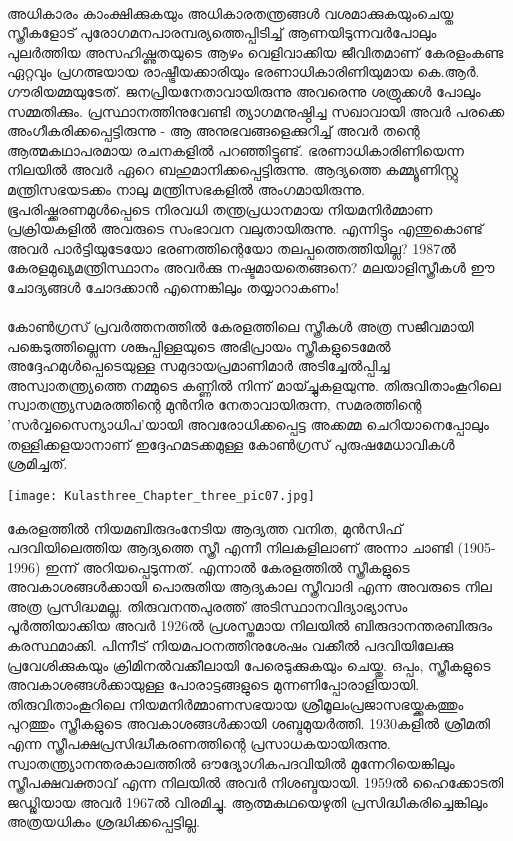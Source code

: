 \paragraph{}

അധികാരം കാംക്ഷിക്കുകയും അധികാരതന്ത്രങ്ങൾ വശമാക്കുകയുംചെയ്ത സ്ത്രീകളോട് പുരോഗമനപാരമ്പര്യത്തെപ്പിടിച്ച് ആണയിടുന്നവർപോലും പുലർത്തിയ അസഹിഷ്ണുതയുടെ ആഴം വെളിവാക്കിയ ജീവിതമാണ് കേരളംകണ്ട ഏറ്റവും പ്രഗത്ഭയായ രാഷ്ട്രീയക്കാരിയും ഭരണാധികാരിണിയുമായ കെ.ആർ. ഗൗരിയമ്മയുടേത്. ജനപ്രിയനേതാവായിരുന്നു അവരെന്നു ശത്രുക്കൾ പോലും സമ്മതിക്കും.
പ്രസ്ഥാനത്തിനുവേണ്ടി ത്യാഗമനുഷ്ഠിച്ച സഖാവായി അവർ പരക്കെ അംഗീകരിക്കപ്പെട്ടിരുന്നു - ആ അനുഭവങ്ങളെക്കുറിച്ച് അവർ തന്റെ ആത്മകഥാപരമായ രചനകളിൽ പറഞ്ഞിട്ടുണ്ട്. ഭരണാധികാരിണിയെന്ന നിലയിൽ അവർ ഏറെ ബഹുമാനിക്കപ്പെട്ടിരുന്നു. ആദ്യത്തെ കമ്മ്യൂണിസ്റ്റു മന്ത്രിസഭയടക്കം നാലു മന്ത്രിസഭകളിൽ അംഗമായിരുന്നു. ഭൂപരിഷ്ക്കരണമുൾപ്പെടെ നിരവധി തന്ത്രപ്രധാനമായ നിയമനിർമ്മാണ പ്രക്രിയകളിൽ അവരുടെ സംഭാവന വലുതായിരുന്നു. എന്നിട്ടും എന്തുകൊണ്ട് അവർ പാർട്ടിയുടേയോ ഭരണത്തിന്റെയോ തലപ്പത്തെത്തിയില്ല? 1987ൽ കേരളമുഖ്യമന്ത്രിസ്ഥാനം അവർക്കു നഷ്ടമായതെങ്ങനെ? മലയാളിസ്ത്രീകൾ ഈ ചോദ്യങ്ങൾ ചോദക്കാൻ എന്നെങ്കിലും തയ്യാറാകണം!
\paragraph{}

കോൺഗ്രസ് പ്രവർത്തനത്തിൽ കേരളത്തിലെ സ്ത്രീകൾ അത്ര സജീവമായി പങ്കെടുത്തില്ലെന്ന ശങ്കുപ്പിള്ളയുടെ അഭിപ്രായം സ്ത്രീകളുടെമേൽ അദ്ദേഹമുൾപ്പെടെയുള്ള സമുദായപ്രമാണിമാർ അടിച്ചേൽപ്പിച്ച അസ്വാതന്ത്ര്യത്തെ നമ്മുടെ കണ്ണിൽ നിന്ന് മായ്ച്ചുകളയുന്നു. തിരുവിതാംകൂറിലെ സ്വാതന്ത്ര്യസമരത്തിന്റെ മുൻനിര നേതാവായിരുന്ന, സമരത്തിന്റെ 'സർവ്വസൈന്യാധിപ'യായി അവരോധിക്കപ്പെട്ട അക്കമ്മ ചെറിയാനെപ്പോലും തള്ളിക്കളയാനാണ് ഇദ്ദേഹമടക്കമുള്ള കോൺഗ്രസ് പുരുഷമേധാവികൾ ശ്രമിച്ചത്.

\label{ch3box3} %
\begin{tcolorbox}[%
 breakable, %
  arc=0mm, 
  left=1pt, right = 1pt, 
  boxrule=0mm,
  colback = {blue!10}, %
] 
\begin{center}
\texttt{[image: Kulasthree\_Chapter\_three\_pic07.jpg]}
\end{center}

കേരളത്തിൽ നിയമബിരുദംനേടിയ ആദ്യത്ത വനിത, മുൻസിഫ് പദവിയിലെത്തിയ ആദ്യത്തെ സ്ത്രീ എന്നീ നിലകളിലാണ് അന്നാ ചാണ്ടി (1905-1996) ഇന്ന് അറിയപ്പെടുന്നത്. എന്നാൽ കേരളത്തിൽ സ്ത്രീകളുടെ അവകാശങ്ങൾക്കായി പൊരുതിയ ആദ്യകാല സ്ത്രീവാദി എന്ന അവരുടെ നില അത്ര പ്രസിദ്ധമല്ല. തിരുവനന്തപുരത്ത് അടിസ്ഥാനവിദ്യാഭ്യാസം പൂർത്തിയാക്കിയ അവർ 1926ൽ പ്രശസ്തമായ നിലയിൽ ബിരുദാനന്തരബിരുദം കരസ്ഥമാക്കി. പിന്നീട് നിയമപഠനത്തിനുശേഷം വക്കീൽ പദവിയിലേക്കു പ്രവേശിക്കുകയും ക്രിമിനൽവക്കീലായി പേരെടുക്കുകയും ചെയ്തു. ഒപ്പം, സ്ത്രീകളുടെ അവകാശങ്ങൾക്കായുള്ള പോരാട്ടങ്ങളുടെ മുന്നണിപ്പോരാളിയായി. തിരുവിതാംകൂറിലെ നിയമനിർമ്മാണസഭയായ ശ്രീമൂലംപ്രജാസഭയ്ക്കകത്തും പുറത്തും സ്ത്രീകളുടെ അവകാശങ്ങൾക്കായി ശബ്ദമുയർത്തി. 1930കളിൽ ശ്രീമതി എന്ന സ്ത്രീപക്ഷപ്രസിദ്ധീകരണത്തിന്റെ പ്രസാധകയായിരുന്നു. സ്വാതന്ത്ര്യാനന്തരകാലത്തിൽ ഔദ്യോഗികപദവിയിൽ മുന്നേറിയെങ്കിലും സ്ത്രീപക്ഷവക്താവ് എന്ന നിലയിൽ അവർ നിശബ്ദയായി. 1959ൽ ഹൈക്കോടതി ജഡ്ജിയായ അവർ 1967ൽ വിരമിച്ചു. ആത്മകഥയെഴുതി പ്രസിദ്ധീകരിച്ചെങ്കിലും അത്രയധികം ശ്രദ്ധിക്കപ്പെട്ടില്ല.
\end{tcolorbox}

